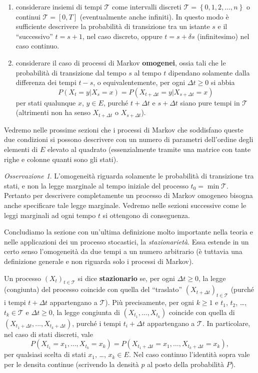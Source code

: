 \documentclass[
  italian,
  letterpaper,
]{book}
\newcommand{\cur}[1]{\left\{ #1 \right\}}
\theoremstyle{definition}
\theoremstyle{remark}
\newtheorem*{remark}{Osservazione}
\begin{document}
\begin{enumerate}
\def\labelenumi{\arabic{enumi}.}
\item
  considerare insiemi di tempi \(\mathcal{T}\) come intervalli discreti
  \(\mathcal{T} = \cur{0,1,2,\ldots, n}\) o continui
  \(\mathcal{T} = [0,T]\) (eventualmente anche infiniti). In questo modo
  è sufficiente descrivere la probabilità di transizione tra un istante
  \(s\) e il ``successivo'' \(t =s+1\), nel caso discreto, oppure
  \(t=s+\delta s\) (infinitesimo) nel caso continuo.
\item
  considerare il caso di processi di Markov \textbf{omogenei}, ossia
  tali che le probabilità di transizione dal tempo \(s\) al tempo \(t\)
  dipendano solamente dalla differenza dei tempi \(t-s\), o
  equivalentemente, per ogni \(\Delta t \ge 0\) si abbia
  \[ P(X_{t } = y | X_s = x) = P(X_{t+\Delta t} = y | X_{s+\Delta t } = x)\]
  per stati qualunque \(x\), \(y \in E\), purché \(t+\Delta t\) e
  \(s+\Delta t\) siano pure tempi in \(\mathcal{T}\) (altrimenti non ha
  senso \(X_{t+\Delta t}\) o \(X_{s+\Delta t}\)).
\end{enumerate}

Vedremo nelle prossime sezioni che i processi di Markov che soddisfano
queste due condizioni si possono descrivere con un numero di parametri
dell'ordine degli elementi di \(E\) elevato al quadrato (essenzialmente
tramite una matrice con tante righe e colonne quanti sono gli stati).

\begin{remark}
L'omogeneità riguarda solamente le probabilità di transizione tra stati,
e non la legge marginale al tempo iniziale del processo
\(t_0 = \min\mathcal{T}\). Pertanto per descrivere completamente un
processo di Markov omogeneo bisogna anche specificare tale legge
marginale. Vedremo nelle sezioni successive come le leggi marginali ad
ogni tempo \(t\) si ottengono di conseguenza.
\end{remark}

Concludiamo la sezione con un'ultima definizione molto importante nella
teoria e nelle applicazioni dei un processo stocastici, la
\emph{stazionarietà}. Essa estende in un certo senso l'omogeneità da due
tempi a un numero arbitrario (è tuttavia una definizione generale e non
riguarda solo i processi di Markov).

Un processo \((X_t)_{t \in \mathcal{T}}\) si dice \textbf{stazionario}
se, per ogni \(\Delta t  \ge 0\), la legge (congiunta) del processo
coincide con quella del ``traslato''
\((X_{t+\Delta t})_{ t \in \mathcal{T}}\) (purché i tempi \(t+\Delta t\)
appartengano a \(\mathcal{T}\)). Più precisamente, per ogni \(k\ge 1\) e
\(t_1\), \(t_2\), \ldots, \(t_k \in \mathcal{T}\) e \(\Delta t \ge 0\),
la legge congiunta di \((X_{t_1}, ..., X_{t_k})\) coincide con quella di
\((X_{t_1+\Delta t}, ..., X_{t_k+\Delta t})\), purché i tempi
\(t_i +\Delta t\) appartengano a \(\mathcal{T}\). In particolare, nel
caso di stati discreti, vale
\[ P( X_{t_1}= x_1, \ldots, X_{t_k}= x_k) =  P( X_{t_1+\Delta t }= x_1, \ldots, X_{t_k+\Delta t}= x_k),\]
per qualsiasi scelta di stati \(x_1\), \ldots, \(x_k \in E\). Nel caso
continuo l'identità sopra vale per le densita continue (scrivendo la
densità \(p\) al posto della probabilità \(P\)).
\end{document}
